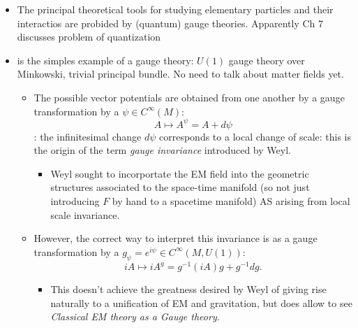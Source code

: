 \begin{itemize}
    \item The principal theoretical tools for studying elementary particles and their interactios are probided by (quantum) gauge theories. Apparently Ch 7 discusses problem of quantization
    
    \item {} is the simples example of a gauge theory: $U(1)$ gauge theory over Minkowski, trivial principal bundle. No need to talk about matter fields yet.
    \begin{itemize}
        \item The possible vector potentials are obtained from one another by a gauge transformation by a $\psi \in C^\infty(M)$: \[A \mapsto A^\psi = A + d\psi\]: the infinitesimal change $d\psi$ corresponds to a local change of scale: this is the origin of the term \emph{gauge invariance} introduced by Weyl.
        \begin{itemize}
            \item Weyl sought to incorportate the EM field into the geometric structures associated to the space-time manifold (so not just introducing $F$ by hand to a spacetime manifold) AS arising from local scale invariance.
        \end{itemize}
        
        \item However, the correct way to interpret this invariance is as a gauge transformation by a $g_\psi = e^{i \psi} \in  C^\infty(M, U(1))$: \[iA \mapsto iA^g = g^{-1} (iA) g + g^{-1} dg.\]
        \begin{itemize}
            \item This doesn't achieve the greatness desired by Weyl of giving rise naturally to a unification of EM and gravitation, but does allow to see \emph{Classical EM theory as a Gauge theory}.
        \end{itemize}
    \end{itemize}
    

\end{itemize}
